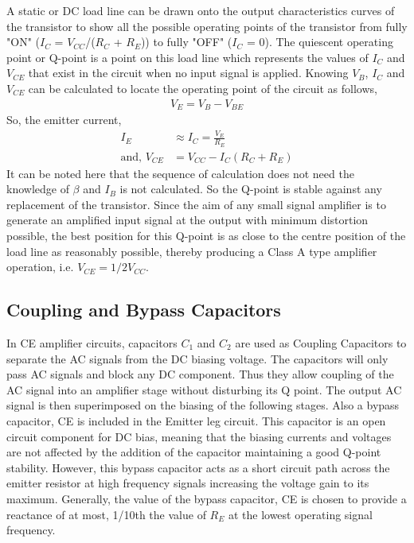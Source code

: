 A static or DC load line can be drawn onto the output characteristics curves of the
transistor to show all the possible operating points of the transistor from fully "ON" ($I_C$ =
$V_{CC}$/($R_C$ + $R_E$)) to fully "OFF" ($I_C$ = 0). The quiescent operating point or Q-point is a
point on this load line which represents the values of $I_C$ and $V_{CE}$ that exist in the circuit
when no input signal is applied. Knowing $V_B$, $I_C$ and $V_{CE}$ can be calculated to locate the
operating point of the circuit as follows,
\begin{align}
V_E = V_B - V_{BE}
\end{align}
So, the emitter current,
\begin{align}
I_E &\approx I_C = \frac{V_E}{R_E}\\
\text{and, } V_{CE} &= V_{CC} - I_C(R_C+R_E)
\end{align}
It can be noted here that the sequence of calculation does not need the knowledge of $\beta$
and $I_B$ is not calculated. So the Q-point is stable against any replacement of the transistor.
Since the aim of any small signal amplifier is to generate an amplified input signal at the
output with minimum distortion possible, the best position for this Q-point is as close to
the centre position of the load line as reasonably possible, thereby producing a Class A
type amplifier operation, i.e. $V_{CE} = 1/2V_{CC}$.

\subsection*{Coupling and Bypass Capacitors}

In CE amplifier circuits, capacitors $C_1$ and $C_2$ are used as Coupling Capacitors to separate
the AC signals from the DC biasing voltage. The capacitors will only pass AC signals
and block any DC component. Thus they allow coupling of the AC signal into an
amplifier stage without disturbing its Q point. The output AC signal is then superimposed
on the biasing of the following stages. Also a bypass capacitor, CE is included in the
Emitter leg circuit. This capacitor is an open circuit component for DC bias, meaning that
the biasing currents and voltages are not affected by the addition of the capacitor
maintaining a good Q-point stability. However, this bypass capacitor acts as a short
circuit path across the emitter resistor at high frequency signals increasing the voltage
gain to its maximum. Generally, the value of the bypass capacitor, CE is chosen to
provide a reactance of at most, 1/10th the value of $R_E$ at the lowest operating signal
frequency.

